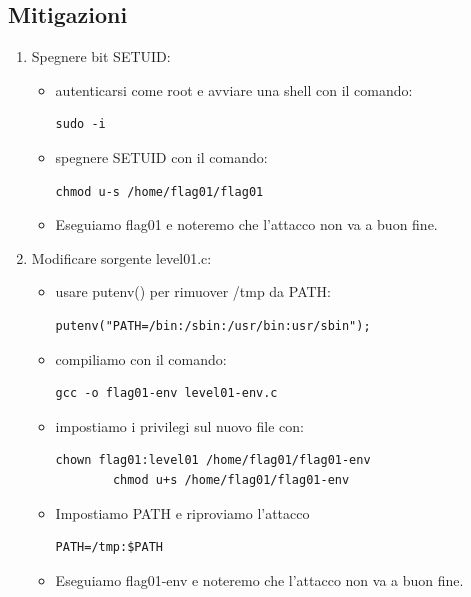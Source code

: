 \subsection{Mitigazioni}
\begin{enumerate}
    \item Spegnere bit SETUID:
    \begin{itemize}
        \item autenticarsi come root e avviare una shell con il comando: \begin{lstlisting}[style=bashstyle] 
        sudo -i
        \end{lstlisting}
        \item spegnere SETUID con il comando: \begin{lstlisting}[style=bashstyle] 
        chmod u-s /home/flag01/flag01
        \end{lstlisting}   
        \item Eseguiamo flag01 e noteremo che l’attacco non va a buon fine. 
    \end{itemize}
    \item Modificare sorgente level01.c:
    \begin{itemize}
        \item usare putenv() per rimuover /tmp da PATH:
        \begin{lstlisting}[style=cstyle]
        putenv("PATH=/bin:/sbin:/usr/bin:usr/sbin");
        \end{lstlisting}
        \item compiliamo con il comando:
        \begin{lstlisting}[style=bashstyle]
        gcc -o flag01-env level01-env.c
        \end{lstlisting}
        \item impostiamo i privilegi sul nuovo file con:
        \begin{lstlisting}[style=bashstyle]
        chown flag01:level01 /home/flag01/flag01-env 
        chmod u+s /home/flag01/flag01-env   
        \end{lstlisting}
        \item Impostiamo PATH e riproviamo l'attacco
        \begin{lstlisting}[style=bashstyle]
        PATH=/tmp:$PATH  
        \end{lstlisting} 
        \item Eseguiamo flag01-env e noteremo che l’attacco non va a buon fine.
    \end{itemize}   
\end{enumerate}



